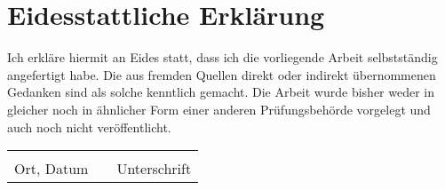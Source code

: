\thispagestyle{plain} %


\chapter*{Eidesstattliche Erklärung}
\glqq Ich erkläre hiermit an Eides statt, dass ich die vorliegende Arbeit selbstständig angefertigt habe. Die aus fremden Quellen direkt oder indirekt übernommenen Gedanken sind als solche kenntlich gemacht. Die Arbeit wurde bisher weder in gleicher noch in ähnlicher Form einer anderen Prüfungsbehörde vorgelegt und auch noch nicht veröffentlicht.\grqq\\[5\baselineskip]
\vspace{2cm}
\begin{tabularx}{\textwidth}{@{}p{5cm}Xp{5cm}@{}} %
    \hrulefill & & \hrulefill \\
    Ort, Datum & & Unterschrift
\end{tabularx}
%